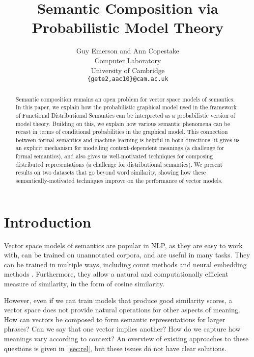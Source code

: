 \documentclass[a4paper,11pt]{article}
\title{Semantic Composition via Probabilistic Model Theory}
\date{}
\author{Guy Emerson and Ann Copestake \\
  Computer Laboratory \\
  University of Cambridge \\
  {\tt \{gete2,aac10\}@cam.ac.uk} \\
}
\begin{document}
\maketitle
\thispagestyle{empty}
\pagestyle{empty}

\begin{abstract}
Semantic composition remains an open problem for vector space models of semantics.
In this paper, we explain how the probabilistic graphical model used in
the framework of Functional Distributional Semantics
can be interpreted as a probabilistic version of model theory.
Building on this, we explain how various semantic phenomena can be recast
in terms of conditional probabilities in the graphical model.
This connection between formal semantics and machine learning is helpful in both directions:
it gives us an explicit mechanism for modelling context-dependent meanings
(a challenge for formal semantics),
and also gives us well-motivated techniques for composing distributed representations
(a challenge for distributional semantics).
We present results on two datasets that go beyond word similarity,
showing how these semantically-motivated techniques
improve on the performance of vector models.
\end{abstract}


\section{Introduction}

Vector space models of semantics are popular in NLP,
as they are easy to work with,
can be trained on unannotated corpora,
and are useful in many tasks.
They can be trained in multiple ways, including count methods \citep{turney2010vector}
and neural embedding methods \citep{mikolov2013vector}.
Furthermore, they allow
a natural and computationally efficient measure of similarity,
in the form of cosine similarity.

However, even if we can train models that produce good similarity scores,
a vector space does not provide natural operations
for other aspects of meaning.
How can vectors be composed
to form semantic representations for larger phrases?
Can we say that one vector implies another?
How do we capture how meanings vary according to context?
An overview of existing approaches to these questions is given in~\cref{sec:rel},
but these issues do not have clear solutions.
\end{document}
